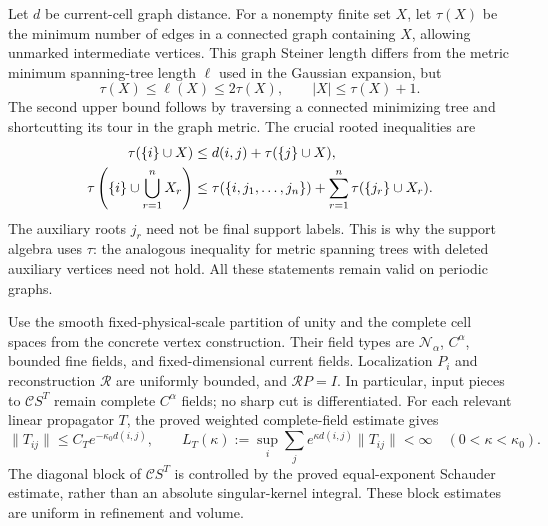 \documentclass[11pt]{article}
\theoremstyle{remark}\newtheorem{remark}[theorem]{Remark}
\begin{document}
Let $d$ be current-cell graph distance. For a nonempty finite set $X$,
let $\tau(X)$ be the minimum number of edges in a connected graph
containing $X$, allowing unmarked intermediate vertices. This graph
Steiner length differs from the metric minimum spanning-tree length
$\ell$ used in the Gaussian expansion, but
\begin{equation}
 \tau(X)\le\ell(X)\le2\tau(X),\qquad |X|\le\tau(X)+1.       \label{cl-metric-comparison}
\end{equation}
The second upper bound follows by traversing a connected minimizing
tree and shortcutting its tour in the graph metric. The crucial rooted
inequalities are
\begin{align}
 \tau(\{i\}\cup X)&\le d(i,j)+\tau(\{j\}\cup X),\notag\\
 \tau\left(\{i\}\cup\bigcup_{r=1}^nX_r\right)
 &\le\tau(\{i,j_1,\ldots,j_n\})
                         +\sum_{r=1}^n\tau(\{j_r\}\cup X_r).
                                                               \label{cl-root-gluing}
\end{align}
The auxiliary roots $j_r$ need not be final support labels. This is why
the support algebra uses $\tau$: the analogous inequality for metric
spanning trees with deleted auxiliary vertices need not hold. All these
statements remain valid on periodic graphs.

Use the smooth fixed-physical-scale partition of unity and the complete
cell spaces from the concrete vertex construction. Their field types
are $\mathcal N_\alpha$, $C^\alpha$, bounded fine fields, and
fixed-dimensional current fields. Localization $P_i$ and reconstruction
$\mathcal R$ are uniformly bounded, and $\mathcal R P=I$.
In particular, input pieces to $\mathcal C S^T$ remain complete
$C^\alpha$ fields; no sharp cut is differentiated. For each relevant
linear propagator $T$, the proved weighted complete-field estimate gives
\begin{equation}
 \|T_{ij}\|\le C_Te^{-\kappa_0d(i,j)},\qquad
 L_T(\kappa):=\sup_i\sum_j e^{\kappa d(i,j)}\|T_{ij}\|<\infty
 \quad(0<\kappa<\kappa_0).                                  \label{cl-linear-blocks}
\end{equation}
The diagonal block of $\mathcal C S^T$ is controlled by the proved
equal-exponent Schauder estimate, rather than an absolute singular-kernel
integral. These block estimates are uniform in refinement and volume.
\end{document}
